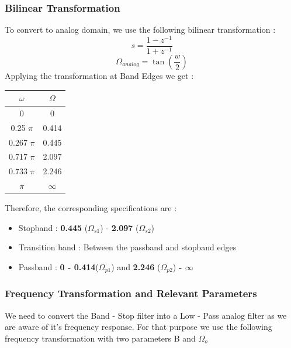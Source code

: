 \documentclass{article}
\begin{document}
\subsubsection{Bilinear Transformation}
To convert to analog domain, we use the following bilinear transformation :
\begin{equation*}
    s = \frac{1 - z^{-1}}{1 + z^{-1}}
\end{equation*}
\begin{equation*}
    \Omega_{analog} = \tan (\frac{w}{2})
\end{equation*}
Applying the transformation at Band Edges we get :
\begin{table}[H]
		\begin{center}
		\begin{tabular}{|c|c|}
			\hline
			$\omega$ & $\Omega$\\
			
			\hline
                0 & 0\\
                \hline
                0.25 $\pi$ & 0.414 \\
                \hline
                0.267 $\pi$ & 0.445\\
                \hline
                0.717 $\pi$ & 2.097\\
                \hline
                0.733 $\pi$ & 2.246\\
                \hline
                $\pi$ & $\infty$\\
                \hline
            
		\end{tabular}
		\end{center}
\end{table}

Therefore, the corresponding specifications are :
\begin{itemize}
    \item Stopband :  \textbf{0.445} ($\Omega_{s1}$) - \textbf{2.097} ($\Omega_{s2}$)
    \item  Transition band : Between the passband and stopband edges
    \item Passband : \textbf{0 - 0.414}($\Omega_{p1}$) and \textbf{2.246} ($\Omega_{p2}$) \textbf{- $\infty$}
\end{itemize}

\subsubsection{Frequency Transformation and Relevant Parameters}
We need to convert the Band - Stop filter into a Low - Pass analog filter as we are aware of it's frequency response. For that purpose we use the following frequency transformation with two parameters B and $\Omega_o$
\end{document}
